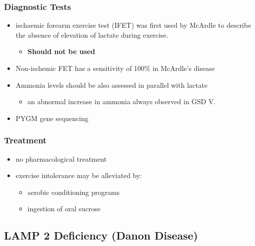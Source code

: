 \documentclass{scrartcl}
\begin{document}
\subsubsection{Diagnostic Tests}
\label{sec:org82dd494}

\begin{itemize}
\item ischaemic forearm exercise test (IFET) was first used by McArdle to
describe the absence of elevation of lactate during exercise.
\begin{itemize}
\item \textbf{Should not be used}
\end{itemize}

\item Non-ischemic FET has a sensitivity of 100\% in McArdle’s disease
\item Ammonia levels should be also assessed in parallel with lactate
\begin{itemize}
\item an abnormal increase in ammonia always observed in GSD V.
\end{itemize}
\item PYGM gene sequencing
\end{itemize}

\subsubsection{Treatment}
\label{sec:org4ed24bf}
\begin{itemize}
\item no pharmacological treatment
\item exercise intolerance may be alleviated by:
\begin{itemize}
\item aerobic conditioning programs
\item ingestion of oral sucrose
\end{itemize}
\end{itemize}
\subsection{LAMP 2 Deficiency (Danon Disease)}
\label{sec:orge04c659}
\end{document}
